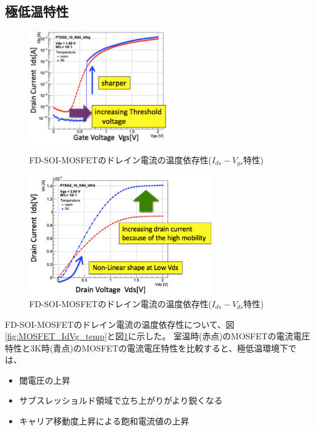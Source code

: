 	\subsection{極低温特性}
		\begin{figure}[htbp]
			\begin{minipage}{0.5\hsize}
				\begin{center}
					\includegraphics[width=60mm]{./Chapter/Chapter3/Picture/MOSFET_IdVg_temp.eps}
				\end{center}
				\caption{FD-SOI-MOSFETのドレイン電流の温度依存性($I_{ds} - V_{gs}$特性)}
				\label{fig:MOSFET_IdVg_temp}
			\end{minipage}
			\begin{minipage}{0.5\hsize}
				\begin{center}
					\includegraphics[width=80mm]{./Chapter/Chapter3/Picture/MOSFET_IdVd_temp.eps}
				\end{center}
				\caption{FD-SOI-MOSFETのドレイン電流の温度依存性($I_{ds} - V_{ds}$特性)}
				\label{fig:MOSFET_IdVd_temp}
			\end{minipage}
		\end{figure}
		FD-SOI-MOSFETのドレイン電流の温度依存性について、図\ref{fig:MOSFET_IdVg_temp}と図\ref{fig:MOSFET_IdVd_temp}に示した。
		室温時(赤点)のMOSFETの電流電圧特性と3K時(青点)のMOSFETの電流電圧特性を比較すると、極低温環境下では、
		\begin{itemize}
			\item 閾電圧の上昇
			\item サブスレッショルド領域で立ち上がりがより鋭くなる
			\item キャリア移動度上昇による飽和電流値の上昇
		\end{itemize}
